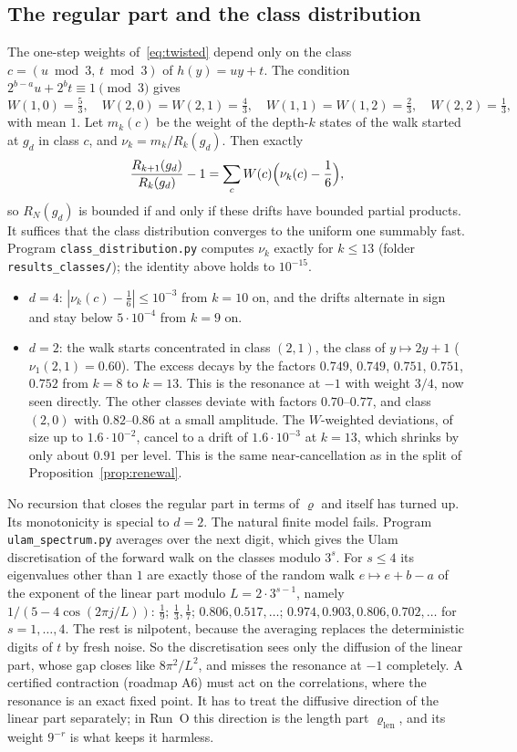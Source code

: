 \documentclass[11pt]{article}
\theoremstyle{remark}
\begin{document}
\subsection*{The regular part and the class distribution}
The one-step weights of~\eqref{eq:twisted} depend only on the class $c=(u\bmod3,\,t\bmod3)$ of $h(y)=uy+t$. The condition $2^{b-a}u+2^bt\equiv1\pmod3$ gives
\[
 W(1,0)=\tfrac53,\quad W(2,0)=W(2,1)=\tfrac43,\quad W(1,1)=W(1,2)=\tfrac23,\quad W(2,2)=\tfrac13 ,
\]
with mean $1$. Let $m_k(c)$ be the weight of the depth-$k$ states of the walk started at $g_d$ in class $c$, and $\nu_k=m_k/R_k(g_d)$. Then exactly
\[
 \frac{R_{k+1}(g_d)}{R_k(g_d)}-1=\sum_cW(c)\Bigl(\nu_k(c)-\frac16\Bigr),
\]
so $R_N(g_d)$ is bounded if and only if these drifts have bounded partial products. It suffices that the class distribution converges to the uniform one summably fast. Program \texttt{class\_distribution.py} computes $\nu_k$ exactly for $k\le13$ (folder \texttt{results\_classes/}); the identity above holds to $10^{-15}$.
\begin{itemize}
\item $d=4$: $|\nu_k(c)-\frac16|\le10^{-3}$ from $k=10$ on, and the drifts alternate in sign and stay below $5\cdot10^{-4}$ from $k=9$ on.
\item $d=2$: the walk starts concentrated in class $(2,1)$, the class of $y\mapsto2y+1$ ($\nu_1(2,1)=0.60$). The excess decays by the factors $0.749$, $0.749$, $0.751$, $0.751$, $0.752$ from $k=8$ to $k=13$. This is the resonance at $-1$ with weight $3/4$, now seen directly. The other classes deviate with factors $0.70$--$0.77$, and class $(2,0)$ with $0.82$--$0.86$ at a small amplitude. The $W$-weighted deviations, of size up to $1.6\cdot10^{-2}$, cancel to a drift of $1.6\cdot10^{-3}$ at $k=13$, which shrinks by only about $0.91$ per level. This is the same near-cancellation as in the split of Proposition~\ref{prop:renewal}.
\end{itemize}
No recursion that closes the regular part in terms of $\varrho$ and itself has turned up. Its monotonicity is special to $d=2$. The natural finite model fails. Program \texttt{ulam\_spectrum.py} averages over the next digit, which gives the Ulam discretisation of the forward walk on the classes modulo $3^s$. For $s\le4$ its eigenvalues other than $1$ are exactly those of the random walk $e\mapsto e+b-a$ of the exponent of the linear part modulo $L=2\cdot3^{s-1}$, namely $1/(5-4\cos(2\pi j/L))$: $\frac19$; $\frac13,\frac17$; $0.806,0.517,\dots$; $0.974,0.903,0.806,0.702,\dots$ for $s=1,\dots,4$. The rest is nilpotent, because the averaging replaces the deterministic digits of $t$ by fresh noise. So the discretisation sees only the diffusion of the linear part, whose gap closes like $8\pi^2/L^2$, and misses the resonance at $-1$ completely. A certified contraction (roadmap A6) must act on the correlations, where the resonance is an exact fixed point. It has to treat the diffusive direction of the linear part separately; in Run~O this direction is the length part $\varrho_{\mathrm{len}}$, and its weight $9^{-r}$ is what keeps it harmless.
\end{document}
